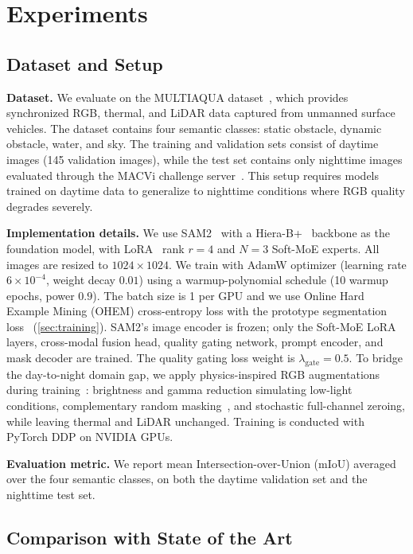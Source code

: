 \section{Experiments}
\label{sec:experiments}

\subsection{Dataset and Setup}

\noindent\textbf{Dataset.}
We evaluate on the MULTIAQUA dataset~\cite{muhovic2025multiaqua}, which provides synchronized RGB, thermal, and LiDAR data captured from unmanned surface vehicles.
The dataset contains four semantic classes: static obstacle, dynamic obstacle, water, and sky.
The training and validation sets consist of daytime images (145 validation images), while the test set contains only nighttime images evaluated through the MACVi challenge server~\cite{bovcon2024macvi}.
This setup requires models trained on daytime data to generalize to nighttime conditions where RGB quality degrades severely.

\noindent\textbf{Implementation details.}
We use SAM2~\cite{ravi2024sam2} with a Hiera-B+~\cite{ryali2023hiera} backbone as the foundation model, with LoRA~\cite{hu2022lora} rank $r{=}4$ and $N{=}3$ Soft-MoE experts.
All images are resized to $1024 \times 1024$.
We train with AdamW optimizer (learning rate $6 \times 10^{-4}$, weight decay $0.01$) using a warmup-polynomial schedule (10 warmup epochs, power $0.9$).
The batch size is 1 per GPU and we use Online Hard Example Mining (OHEM) cross-entropy loss with the prototype segmentation loss~\cite{chen2025memorysam} (\cref{sec:training}).
SAM2's image encoder is frozen; only the Soft-MoE LoRA layers, cross-modal fusion head, quality gating network, prompt encoder, and mask decoder are trained.
The quality gating loss weight is $\lambda_\text{gate} = 0.5$.
To bridge the day-to-night domain gap, we apply physics-inspired RGB augmentations during training~\cite{muhovic2025multiaqua}: brightness and gamma reduction simulating low-light conditions, complementary random masking~\cite{shin2024crm}, and stochastic full-channel zeroing, while leaving thermal and LiDAR unchanged.
Training is conducted with PyTorch DDP on NVIDIA GPUs.

\noindent\textbf{Evaluation metric.}
We report mean Intersection-over-Union (mIoU) averaged over the four semantic classes, on both the daytime validation set and the nighttime test set.


\subsection{Comparison with State of the Art}

